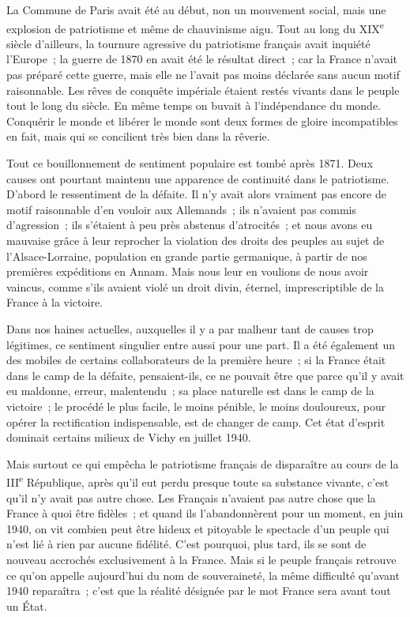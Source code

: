 \documentclass[french,twoside]{book} %
\begin{document}
La Commune de Paris avait été au début, non un mouvement social, mais une explosion de patriotisme et même de chauvinisme aigu. Tout au long du XIX\textsuperscript{e} siècle d'ailleurs, la tournure agressive du patriotisme français avait inquiété l'Europe ; la guerre de 1870 en avait été le résultat direct ; car la France n'avait pas préparé cette guerre, mais elle ne l'avait pas moins déclarée sans aucun motif raisonnable. Les rêves de conquête impériale étaient restés vivants dans le peuple tout le long du siècle. En même temps on buvait à l'indépendance du monde. Conquérir le monde et libérer le monde sont deux formes de gloire incompatibles en fait, mais qui se concilient très bien dans la rêverie.\par
Tout ce bouillonnement de sentiment populaire est tombé après 1871. Deux causes ont pourtant maintenu une apparence de continuité dans le patriotisme. D'abord le ressentiment de la défaite. Il n'y avait alors vraiment pas encore de motif raisonnable d'en vouloir aux Allemands ; ils n'avaient pas commis d'agression ; ils s'étaient à peu près abstenus d'atrocités ; et nous avons eu mauvaise grâce à leur reprocher la violation des droits des peuples au sujet de l'Alsace-Lorraine, population en grande partie germanique, à partir de nos premières expéditions en Annam. Mais nous leur en voulions de nous avoir vaincus, comme s'ils avaient violé un droit divin, éternel, imprescriptible de la France à la victoire.\par
Dans nos haines actuelles, auxquelles il y a par malheur tant de causes trop légitimes, ce sentiment singulier entre aussi pour une part. Il a été également un des mobiles de certains collaborateurs de la première heure ; si la France était dans le camp de la défaite, pensaient-ils, ce ne pouvait être que parce qu'il y avait eu maldonne, erreur, malentendu ; sa place naturelle est dans le camp de la victoire ; le procédé le plus facile, le moins pénible, le moins douloureux, pour opérer la rectification indispensable, est de changer de camp. Cet état d'esprit dominait certains milieux de Vichy en juillet 1940.\par
Mais surtout ce qui empêcha le patriotisme français de disparaître au cours de la III\textsuperscript{e} République, après qu'il eut perdu presque toute sa substance vivante, c'est qu'il n'y avait pas autre chose. Les Français n'avaient pas autre chose que la France à quoi être fidèles ; et quand ils l'abandonnèrent pour un moment, en juin 1940, on vit combien peut être hideux et pitoyable le spectacle d'un peuple qui n'est lié à rien par aucune fidélité. C'est pourquoi, plus tard, ils se sont de nouveau accrochés exclusivement à la France. Mais si le peuple français retrouve ce qu'on appelle aujourd'hui du nom de souveraineté, la même difficulté qu'avant 1940 reparaîtra ; c'est que la réalité désignée par le mot France sera avant tout un État.\par
\end{document}
